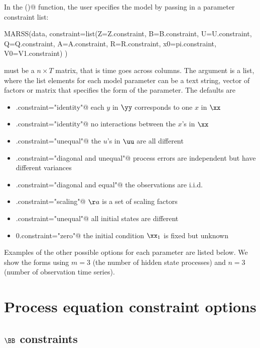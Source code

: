 In the \verb@MARSS()@ function, the user specifies the model by passing in a parameter constraint list:
\begin{Schunk}
\begin{Sinput}
MARSS(data, constraint=list(Z=Z.constraint, B=B.constraint, 
       U=U.constraint, Q=Q.constraint, A=A.constraint, 
       R=R.constraint, x0=pi.constraint, V0=V1.constraint) ) 
\end{Sinput}
\end{Schunk}
\verb@data@ must be a $n \times T$ matrix, that is time goes across columns.   The argument \verb@constraint@ is a list, where the list elements for each model parameter can be a text string, vector of factors or matrix that specifies the form of the parameter.  The defaults are
\begin{itemize}
\item[] \verb@Z.constraint="identity"@ each $y$ in $\yy$ corresponds to one $x$ in $\xx$
\item[] \verb@B.constraint="identity"@ no interactions between the $x$'s in $\xx$
\item[] \verb@U.constraint="unequal"@ the $u$'s in $\uu$ are all different
\item[] \verb@Q.constraint="diagonal and unequal"@ process errors are independent but have different variances
\item[] \verb@R.constraint="diagonal and equal"@ the observations are i.i.d.
\item[] \verb@A.constraint="scaling"@ $\aa$ is a set of scaling factors
\item[] \verb@pi.constraint="unequal"@ all initial states are different
\item[] \verb@V0.constraint="zero"@ the initial condition $\xx_1$ is fixed but unknown
\end{itemize}
Examples of the other possible \verb@constraint@ options for each parameter are listed below.  We show the forms using $m=3$ (the number of hidden state processes) and $n=3$ (number of observation time series).

\section{Process equation constraint options}

\subsection{$\BB$ constraints}

